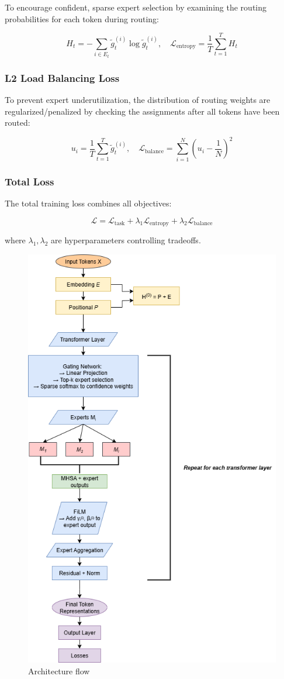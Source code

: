 \documentclass{article}
\begin{document}
To encourage confident, sparse expert selection by examining the routing probabilities for each token during routing:

\[
H_t = -\sum_{i \in E_t} \tilde{g}_t^{(i)} \log \tilde{g}_t^{(i)}, \quad \mathcal{L}_{\text{entropy}} = \frac{1}{T} \sum_{t=1}^{T} H_t
\]

\subsubsection{L2 Load Balancing Loss}

To prevent expert underutilization, the distribution of routing weights are regularized/penalized by checking the assignments after all tokens have been routed:

\[
u_i = \frac{1}{T} \sum_{t=1}^{T} \tilde{g}_t^{(i)}, \quad 
\mathcal{L}_{\text{balance}} = \sum_{i=1}^{N} \left( u_i - \frac{1}{N} \right)^2
\]

\subsubsection{Total Loss}

The total training loss combines all objectives:

\[
\mathcal{L} = \mathcal{L}_{\text{task}} + \lambda_1 \mathcal{L}_{\text{entropy}} + \lambda_2 \mathcal{L}_{\text{balance}}
\]


\noindent
where \( \lambda_1, \lambda_2 \) are hyperparameters controlling tradeoffs.

\vspace{5pt}
\begin{figure}[ht!]
    \centering
    \includegraphics[width=0.4\linewidth]{gmat_final_arc.drawio.png}
    \caption{Architecture flow}
    \label{fig:arc_flow}
\end{figure}
\end{document}
